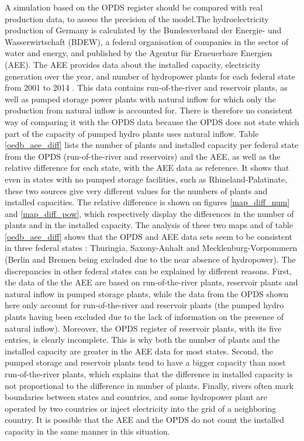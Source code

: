 A simulation based on the OPDS register should be compared with real production data, to assess the precision of the model.\newline The hydroelectricity production of Germany is calculated by the Bundesverband der Energie- und Wasserwirtschaft (BDEW), a federal organisation of companies in the sector of water and energy, and published by the Agentur für Erneuerbare Energien (AEE). The AEE provides data about the installed capacity, electricity generation over the year, and number of hydropower plants for each federal state from 2001 to 2014 \cite{aee}. This data contains run-of-the-river and reservoir plants, as well as pumped storage power plants with natural inflow for which only the production from natural inflow is accounted for. There is therefore no consistent way of comparing it with the OPDS data because the OPDS does not state which part of the capacity of pumped hydro plants uses natural inflow. \newline
Table \ref{oedb_aee_diff} lists the number of plants and installed capacity per federal state from the OPDS (run-of-the-river and reservoirs) and the AEE, as well as the relative difference for each state, with the AEE data as reference. It shows that even in states with no pumped storage facilities, such as Rhineland-Palatinate, these two sources give very different values for the numbers of plants and installed capacities. \newline
The relative difference is shown on figures \ref{map_diff_num} and \ref{map_diff_pow}, which respectively display the differences in the number of plants and in the installed capacity. The analysis of these two maps and of table \ref{oedb_aee_diff} shows that the OPDS and AEE data sets seem to be consistent in three federal states : Thuringia, Saxony-Anhalt and Mecklenburg-Vorpommern (Berlin and Bremen being excluded due to the near absence of hydropower). The discrepancies in other federal states can be explained by different reasons. First, the data of the the AEE are based on run-of-the-river plants, reservoir plants and natural inflow in pumped storage plants, while the data from the OPDS shown here only account for run-of-the-river and reservoir plants (the pumped hydro plants having been excluded due to the lack of information on the presence of natural inflow). Moreover, the OPDS register of reservoir plants, with its five entries, is clearly incomplete. This is why both the number of plants and the installed capacity are greater in the AEE data for most states. Second, the pumped storage and reservoir plants tend to have a bigger capacity than most run-of-the-river plants, which explains that the difference in installed capacity is not proportional to the difference in number of plants. Finally, rivers often mark boundaries between states and countries, and some hydropower plant are operated by two countries or inject electricity into the grid of a neighboring country. It is possible that the AEE and the OPDS do not count the installed capacity in the same manner in this situation.

